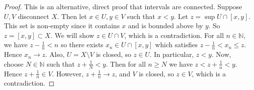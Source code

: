 \begin{proof}
	This is an alternative, direct proof that intervals are connected.
	Suppose \( U, V \) disconnect \( X \).
	Then let \( x \in U, y \in V \) such that \( x < y \).
	Let \( z = \sup U \cap [x,y] \).
	This set is non-empty since it contains \( x \) and is bounded above by \( y \).
	So \( z = [x,y] \subset X \).
	We will show \( z \in U \cap V \), which is a contradiction.
	For all \( n \in \mathbb N \), we have \( z - \frac{1}{n} < n \) so there exists \( x_n \in U \cap [x,y] \) which satisfies \( z - \frac{1}{n} < x_n \leq z \).
	Hence \( x_n \to z \).
	Also, \( U = X \setminus V \) is closed, so \( z \in U \).
	In particular, \( z < y \).
	Now, choose \( N \in \mathbb N \) such that \( z + \frac{1}{N} < y \).
	Then for all \( n \geq N \) we have \( z < z + \frac{1}{n} < y \).
	Hence \( z + \frac{1}{n} \in V \).
	However, \( z + \frac{1}{n} \to z \), and \( V \) is closed, so \( z \in V \), which is a contradiction.
\end{proof}


